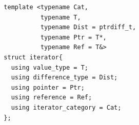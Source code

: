 \begin{frame}[fragile]
\begin{lstlisting}
  template <typename Cat,
            typename T,
            typename Dist = ptrdiff_t,
            typename Ptr = T*,
            typename Ref = T&>
  struct iterator{
    using value_type = T;
    using difference_type = Dist;
    using pointer = Ptr;
    using reference = Ref;
    using iterator_category = Cat;
  };
\end{lstlisting}
\end{frame}
